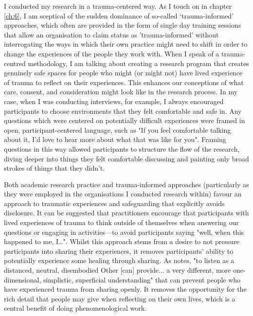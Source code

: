 I conducted my research in a trauma-centered way. As I touch on in chapter \ref{ch:6}, I am sceptical of the sudden dominance of so-called ‘trauma-informed’ approaches, which often are provided in the form of single day training sessions that allow an organisation to claim status as 'trauma-informed' without interrogating the ways in which their own practice might need to shift in order to change the experiences of the people they work with. When I speak of a trauma-centred methodology, I am talking about creating a research program that creates genuinely safe spaces for people who might (or might not) have lived experience of trauma to reflect on their experiences. This enhances our conceptions of what care, consent, and consideration might look like in the research process. In my case, when I was conducting interviews, for example, I always encouraged participants to choose environments that they felt comfortable and safe in. Any questions which were centered on potentially difficult experiences were framed in open, participant-centered language, such as "If you feel comfortable talking about it, I’d love to hear more about what that was like for you". Framing questions in this way allowed participants to structure the flow of the research, diving deeper into things they felt comfortable discussing and painting only broad strokes of things that they didn’t. 

Both academic research practice and trauma-informed approaches (particularly as they were employed in the organisations I conducted research within) favour an approach to traumatic experiences and safeguarding that explicitly avoids disclosure. It can be suggested that practitioners encourage that participants with lived experiences of trauma to think outside of themselves when answering our questions or engaging in activities—to avoid participants saying "well, when this happened to me, I…". Whilst this approach stems from a desire to not pressure participants into sharing their experiences, it removes participants' ability to potentially experience some healing through sharing. As \citet[p. 56]{carless_narrating_2016} notes, "to listen as a distanced, neutral, disembodied Other [can] provide... a very different, more one-dimensional, simplistic, superficial understanding" that can prevent people who have experienced trauma from sharing openly. It removes the opportunity for the rich detail that people may give when reflecting on their own lives, which is a central benefit of doing phenomenological work.

